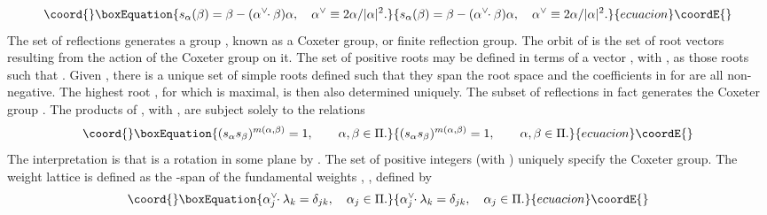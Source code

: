 \documentclass[a4paper,12pt]{article}
\begin{document}
\begin{equation}\coord{}\boxEquation{
   \label{Root_reflection}
   s_{\alpha}(\beta)=\beta-(\alpha^{\vee}\!\!\cdot\beta)\alpha,
\quad \alpha^{\vee}\equiv2\alpha/|\alpha|^{2}.
}{
   s_{\alpha}(\beta)=\beta-(\alpha^{\vee}\!\!\cdot\beta)\alpha,
\quad \alpha^{\vee}\equiv2\alpha/|\alpha|^{2}.
}{ecuacion}\coordE{}\end{equation}
The set of reflections \coordHE{} generates a
group \coordHE{}, known as a Coxeter group, or finite reflection group.
The orbit of \myHighlight{\(\beta\in\Delta\)}\coordHE{} is the set of root vectors
resulting from the action of the Coxeter group on it.
The set of positive roots \myHighlight{\(\Delta_{+}\)}\coordHE{} may be defined in terms of a
vector \coordHE{}, with
\coordHE{}, as
those roots \myHighlight{\(\alpha\in\Delta\)}\coordHE{} such that \coordHE{}.  Given
\myHighlight{\(\Delta_{+}\)}\coordHE{}, there is a unique
set of \coordHE{} simple roots \coordHE{}
defined such that they span
the root space and the coefficients \coordHE{} in
\coordHE{} for \myHighlight{\(\beta\in\Delta_{+}\)}\coordHE{}
are all non-negative. The highest root  \coordHE{}, for which
\coordHE{} is maximal, is then also determined
uniquely.
The subset of reflections \coordHE{}
in fact generates the
Coxeter group \coordHE{}.  The products of
\coordHE{}, with \myHighlight{\(\alpha\in \Pi\)}\coordHE{}, are subject solely to the relations
\begin{equation}\coord{}\boxEquation{
   \label{Coxeter_relations}
   (s_{\alpha}s_{\beta})^{m(\alpha,\beta)}=1,\qquad \alpha,\beta\in \Pi.
}{
   (s_{\alpha}s_{\beta})^{m(\alpha,\beta)}=1,\qquad \alpha,\beta\in \Pi.
}{ecuacion}\coordE{}\end{equation}
The interpretation is that \coordHE{} is a rotation in some
plane by \coordHE{}.
The set of positive integers \coordHE{}
(with \coordHE{})
uniquely specify the Coxeter group.
The weight lattice \myHighlight{\(\Lambda(\Delta)\)}\coordHE{} is defined as the \coordHE{}-span
of the fundamental weights \coordHE{}, \coordHE{}, defined
by
\begin{equation}\coord{}\boxEquation{
   \alpha^{\vee}_j\!\!\cdot\lambda_k=\delta_{jk},\quad \alpha_j\in\Pi.
}{
   \alpha^{\vee}_j\!\!\cdot\lambda_k=\delta_{jk},\quad \alpha_j\in\Pi.
}{ecuacion}\coordE{}\end{equation}
\end{document}

